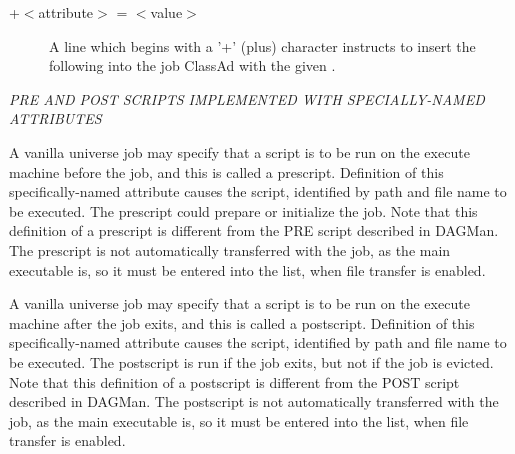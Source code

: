 \begin{description}

\item[+$<$attribute$>$ = $<$value$>$] A line which begins with a '+'
(plus) character instructs  to insert the
following  into the job ClassAd with the given 
. 

\end{description} 

\emph{PRE AND POST SCRIPTS IMPLEMENTED WITH SPECIALLY-NAMED ATTRIBUTES}
\begin{description} 


\label{man-condor-submit-prescript}
\item[+PreCmd = $<$executable$>$]
A vanilla universe job may specify that a script is to be run 
on the execute machine before the job, and this is called a prescript.
Definition of this specifically-named attribute causes the script,
identified by path and file name to be executed. 
The prescript could prepare or initialize the job.
Note that this definition of a prescript is different from the PRE script 
described in DAGMan.
The prescript is not automatically transferred with the job,
as the main executable is, 
so it must be entered into the  list,
when file transfer is enabled.


\label{man-condor-submit-postscript}
\item[+PostCmd = $<$executable$>$]
A vanilla universe job may specify that a script is to be run 
on the execute machine after the job exits, and this is called a postscript.
Definition of this specifically-named attribute causes the script,
identified by path and file name to be executed. 
The postscript is run if the job exits, but not if the job is evicted.
Note that this definition of a postscript is different from the POST script 
described in DAGMan.
The postscript is not automatically transferred with the job,
as the main executable is, 
so it must be entered into the  list,
when file transfer is enabled.

\end{description} 


